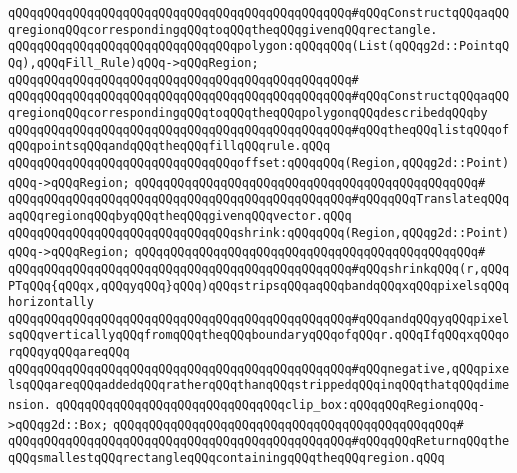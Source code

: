 \verb|qQQqqQQqqQQqqQQqqQQqqQQqqQQqqQQqqQQqqQQqqQQqqQQq#qQQqConstructqQQqaqQQqregionqQQqcorrespondingqQQqtoqQQqtheqQQqgivenqQQqrectangle.|\newline
\newline
\verb|qQQqqQQqqQQqqQQqqQQqqQQqqQQqqQQqpolygon:qQQqqQQq(List(qQQqg2d::PointqQQq),qQQqFill_Rule)qQQq->qQQqRegion;|\newline
\verb|qQQqqQQqqQQqqQQqqQQqqQQqqQQqqQQqqQQqqQQqqQQqqQQq#|\newline
\verb|qQQqqQQqqQQqqQQqqQQqqQQqqQQqqQQqqQQqqQQqqQQqqQQq#qQQqConstructqQQqaqQQqregionqQQqcorrespondingqQQqtoqQQqtheqQQqpolygonqQQqdescribedqQQqby|\newline
\verb|qQQqqQQqqQQqqQQqqQQqqQQqqQQqqQQqqQQqqQQqqQQqqQQq#qQQqtheqQQqlistqQQqofqQQqpointsqQQqandqQQqtheqQQqfillqQQqrule.qQQq|\newline
\newline
\verb|qQQqqQQqqQQqqQQqqQQqqQQqqQQqqQQqoffset:qQQqqQQq(Region,qQQqg2d::Point)qQQq->qQQqRegion;|\newline
\verb|qQQqqQQqqQQqqQQqqQQqqQQqqQQqqQQqqQQqqQQqqQQqqQQq#|\newline
\verb|qQQqqQQqqQQqqQQqqQQqqQQqqQQqqQQqqQQqqQQqqQQqqQQq#qQQqqQQqTranslateqQQqaqQQqregionqQQqbyqQQqtheqQQqgivenqQQqvector.qQQq|\newline
\newline
\verb|qQQqqQQqqQQqqQQqqQQqqQQqqQQqqQQqshrink:qQQqqQQq(Region,qQQqg2d::Point)qQQq->qQQqRegion;|\newline
\verb|qQQqqQQqqQQqqQQqqQQqqQQqqQQqqQQqqQQqqQQqqQQqqQQq#|\newline
\verb|qQQqqQQqqQQqqQQqqQQqqQQqqQQqqQQqqQQqqQQqqQQqqQQq#qQQqshrinkqQQq(r,qQQqPTqQQq{qQQqx,qQQqyqQQq}qQQq)qQQqstripsqQQqaqQQqbandqQQqxqQQqpixelsqQQqhorizontally|\newline
\verb|qQQqqQQqqQQqqQQqqQQqqQQqqQQqqQQqqQQqqQQqqQQqqQQq#qQQqandqQQqyqQQqpixelsqQQqverticallyqQQqfromqQQqtheqQQqboundaryqQQqofqQQqr.qQQqIfqQQqxqQQqorqQQqyqQQqareqQQq|\newline
\verb|qQQqqQQqqQQqqQQqqQQqqQQqqQQqqQQqqQQqqQQqqQQqqQQq#qQQqnegative,qQQqpixelsqQQqareqQQqaddedqQQqratherqQQqthanqQQqstrippedqQQqinqQQqthatqQQqdimension.|\newline
\newline
\verb|qQQqqQQqqQQqqQQqqQQqqQQqqQQqqQQqclip_box:qQQqqQQqRegionqQQq->qQQqg2d::Box;|\newline
\verb|qQQqqQQqqQQqqQQqqQQqqQQqqQQqqQQqqQQqqQQqqQQqqQQq#|\newline
\verb|qQQqqQQqqQQqqQQqqQQqqQQqqQQqqQQqqQQqqQQqqQQqqQQq#qQQqqQQqReturnqQQqtheqQQqsmallestqQQqrectangleqQQqcontainingqQQqtheqQQqregion.qQQq|\newline
